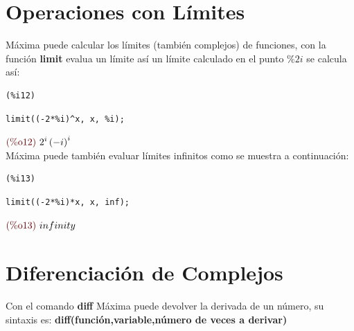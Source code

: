 \documentclass[10pt,a4paper]{book}
\begin{document}
\section{Operaciones con Límites}
Máxima puede calcular los límites (también complejos) de funciones, con la función \textbf{limit} evalua un límite así un límite calculado en el punto $\%2i$ se calcula así: 

\noindent
\begin{minipage}[t]{8ex}{\color{red}\bf
\begin{verbatim}
(%i12) 
\end{verbatim}}
\end{minipage}
\begin{minipage}[t]{\textwidth}{\color{blue}
\begin{verbatim}
limit((-2*%i)^x, x, %i);
\end{verbatim}}
\end{minipage}
\begin{math}\displaystyle
\parbox{8ex}{\color{labelcolor}(\%o12) }
{2}^{i}\,{\left( - i\right) }^{i}
\end{math}
\\ Máxima puede también evaluar límites infinitos como se muestra a continuación: \\

\noindent
\begin{minipage}[t]{8ex}{\color{red}\bf
\begin{verbatim}
(%i13) 
\end{verbatim}}
\end{minipage}
\begin{minipage}[t]{\textwidth}{\color{blue}
\begin{verbatim}
limit((-2*%i)*x, x, inf);
\end{verbatim}}
\end{minipage}
\begin{math}\displaystyle
\parbox{8ex}{\color{labelcolor}(\%o13) }
infinity
\end{math}
\section{Diferenciación de Complejos}
Con el comando \textbf{diff} Máxima puede devolver la derivada de un número, su sintaxis es: \textbf{diff(función,variable,número de veces a derivar)}
\end{document}
